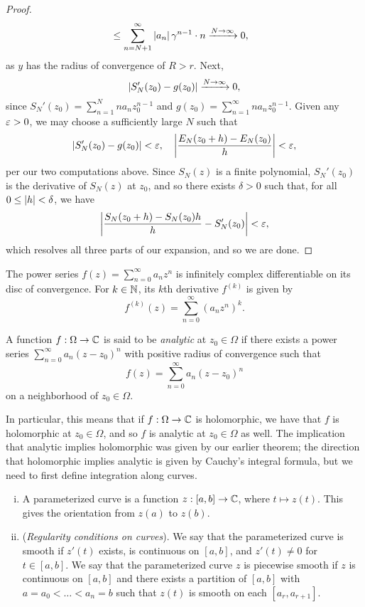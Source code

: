 \begin{proof}
\begin{align*}
        &\leq \sum_{n=N+1}^\infty \left\lvert a_n \right\rvert \gamma^{n-1} \cdot n \xrightarrow{N \to \infty} 0,
    \end{align*}
    as $y$ has the radius of convergence of $R > r$. Next,
    \[ \left\lvert S_N'(z_0) - g(z_0) \right\rvert \xrightarrow{N \to \infty} 0, \]
    since $S_N'(z_0) = \sum_{n=1}^N n a_n z_0^{n-1}$ and $g(z_0) = \sum_{n=1}^\infty n a_n z_0^{n-1}$. Given any $\varepsilon > 0$, we may choose a sufficiently large $N$ such that
    \[ \left\lvert S_N'(z_0) - g(z_0) \right\rvert < \varepsilon, \quad \left\lvert \frac{E_N(z_0 + h) - E_N(z_0)}{h} \right\rvert < \varepsilon, \]
    per our two computations above. Since $S_N(z)$ is a finite polynomial, $S_N'(z_0)$ is the derivative of $S_N(z)$ at $z_0$, and so there exists $\delta > 0$ such that, for all $0 \leq \left\lvert h \right\rvert < \delta$, we have
    \[ \left\lvert \frac{S_N(z_0 + h) - S_N(z_0){h}}{h} - S_N'(z_0) \right\rvert < \varepsilon, \]
    which resolves all three parts of our expansion, and so we are done.
\end{proof}
\begin{corollary}
    The power series $f(z) = \sum_{n=0}^\infty a_n z^n$ is infinitely complex differentiable on its disc of convergence. For $k \in \mathbb N$, its $k$th derivative $f^{(k)}$ is given by
    \[ f^{(k)}(z) = \sum_{n=0}^\infty (a_n z^n)^k. \]
\end{corollary}
\begin{definition}
    A function $f : \Omega \to \mathbb C$ is said to be \textit{analytic} at $z_0 \in \Omega$ if there exists a power series $\sum_{n=0}^\infty a_n (z - z_0)^n$ with positive radius of convergence such that
    \[ f(z) = \sum_{n=0}^\infty a_n (z - z_0)^n \]
    on a neighborhood of $z_0 \in \Omega$.
\end{definition}
\noindent In particular, this means that if $f : \Omega \to \mathbb C$ is holomorphic, we have that $f$ is holomorphic at $z_0 \in \Omega$, and so $f$ is analytic at $z_0 \in \Omega$ as well. The implication that analytic implies holomorphic was given by our earlier theorem; the direction that holomorphic implies analytic is given by Cauchy's integral formula, but we need to first define integration along curves.
\begin{enumerate}[(i)]
    \item A parameterized curve is a function $z : [a, b] \to \mathbb C$, where $t \mapsto z(t)$. This gives the orientation from $z(a)$ to $z(b)$.
    \item (\textit{Regularity conditions on curves}). We say that the parameterized curve is smooth if $z'(t)$ exists, is continuous on $[a, b]$, and $z'(t) \neq 0$ for $t \in [a, b]$. We say that the parameterized curve $z$ is piecewise smooth if $z$ is continuous on $[a, b]$ and there exists a partition of $[a, b]$ with $a = a_0 < \dots < a_n = b$ such that $z(t)$ is smooth on each $[a_r, a_{r+1}]$.
\end{enumerate}